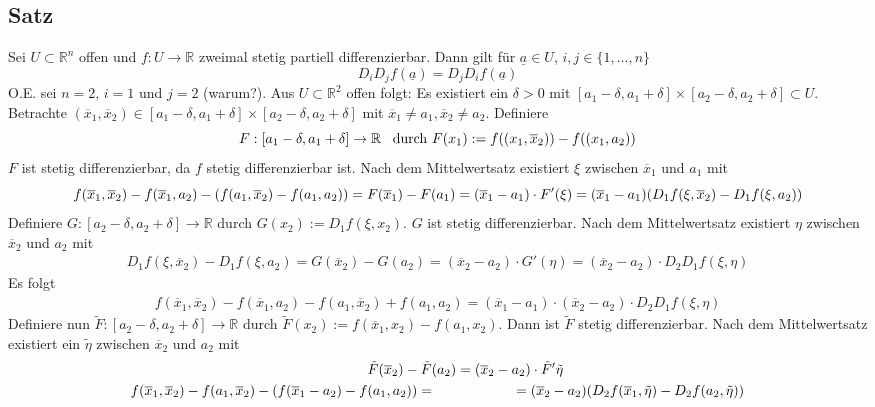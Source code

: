 \subsection[Satz über Reihenfolge des Differenzierens]{Satz} %
\label{sub:66}
Sei $U \subset \mathds{R}^n$ offen und $f : U \to \mathds{R}$ zweimal stetig partiell differenzierbar. Dann gilt für $\underline{a} \in U $, $i,j \in \{1, \ldots ,n\}$
\[
	D_i D_j f (\underline{a}) =  D_j D_i f(\underline{a})
\]
O.E. sei $n=2$, $i=1$ und $j=2$ (warum?). Aus $U \subset \mathds{R}^2$ offen folgt: Es existiert ein $\delta >0$ mit 
$[a_1 - \delta , a_1 + \delta ] \times [a_2 - \delta , a_2 + \delta ] \subset U$. Betrachte $(\overline{x}_1, \overline{x}_2) \in  [a_1 - \delta , a_1 + \delta ] \times 
[a_2 - \delta , a_2 + \delta ] $ mit $\overline{x}_1 \not=a_1 , \overline{x}_2 \not= a_2$. Definiere
\[
	F: [a_1 - \delta , a_1 + \delta ] \to \mathbb{R} \enspace \text{ durch } F(x_1) := f ( (x_1, \overline{x}_2 )) - f ((x_1, a_2))  
\]
$F$ ist stetig differenzierbar, da $f$ stetig differenzierbar ist. Nach dem Mittelwertsatz existiert $\xi$ zwischen $\overline{x}_1 $ und $a_1$ mit 
\[
	 f(\overline{x}_1, \overline{x}_2 ) - f(\overline{x}_1, a_2 ) - ( f(a_1, \overline{x}_2 ) - f (a_1, a_2)) = F(\overline{x}_1 ) - F(a_1) = 
	 (\overline{x}_1 - a_1 ) \cdot F'(\xi) = (\overline{x}_1 - a_1 ) ( D_1 f(\xi, \overline{x}_2 ) - D_1 f(\xi, a_2) )
\]
Definiere $G : [a_2 - \delta , a_2 + \delta ] \to \mathds{R}$ durch $G(x_2) := D_1 f (\xi, x_2)$. $G$ ist stetig differenzierbar. Nach dem Mittelwertsatz existiert
$\eta$ zwischen $\overline{x}_2 $ und $a_2$ mit 
\begin{gather*}
	D_1 f(\xi, \overline{x}_2 ) - D_1 f(\xi, a_2) = G(\overline{x}_2 ) - G(a_2) = (\overline{x}_2 - a_2 ) \cdot G'(\eta) = (\overline{x}_2 - a_2) \cdot D_2 D_1 f(\xi, \eta)
\end{gather*}
Es folgt 
\begin{align*}
	f(\overline{x}_1, \overline{x}_2 ) - f(\overline{x}_1, a_2 ) - f(a_1, \overline{x}_2 ) + f(a_1, a_2) = (\overline{x}_1 - a_1 ) \cdot ( \overline{x}_2 - a_2 ) \cdot  
	D_2 D_1 f(\xi, \eta) \tag{$\star$}
\end{align*}
Definiere nun $\tilde F : [a_2 - \delta , a_2 + \delta ] \to \mathds{R}$ durch $\tilde F (x_2) := f (\overline{x}_1, x_2 ) - f(a_1, x_2)$. Dann ist $\tilde F$ stetig 
differenzierbar. Nach dem Mittelwertsatz existiert ein $\tilde \eta$ zwischen $\overline{x}_2 $ und $a_2$ mit 
\begin{gather*}
	\qquad \qquad \tilde F (\overline{x}_2 ) - \tilde F (a_2) = (\overline{x}_2 -a_2 ) \cdot \tilde F'{\tilde \eta} \\
	f(\overline{x}_1 , \overline{x}_2  ) - f(a_1, \overline{x}_2 ) - ( f(\overline{x}_1 - a_2 ) - f(a_1, a_2)) =\qquad \qquad \qquad 
	= (\overline{x}_2 - a_2 ) (D_2 f(\overline{x}_1, \tilde \eta ) - D_2 f(a_2, \tilde \eta))
\end{gather*}
